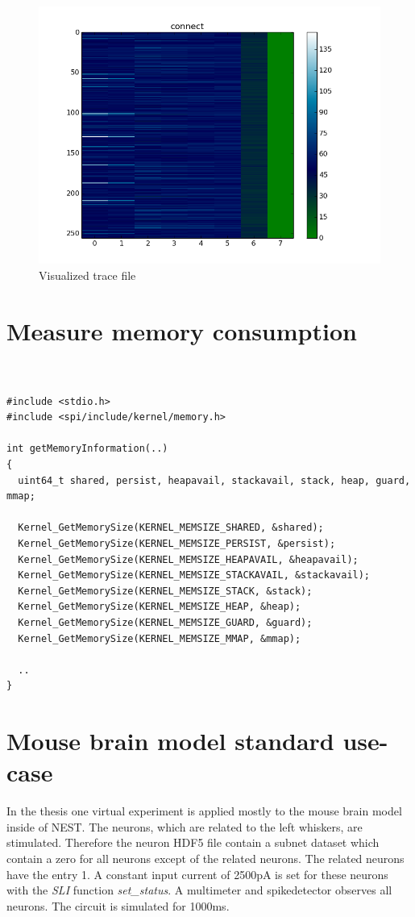 \begin{figure}[ht!]
\centering
\includegraphics[scale=0.4]{pictures/1per300_tracefile_connect.png}
\caption{Visualized trace file}
\end{figure}

\chapter{Measure memory consumption}
\label{bgqmemory}
\begin{lstlisting}


#include <stdio.h>
#include <spi/include/kernel/memory.h>

int getMemoryInformation(..)
{
  uint64_t shared, persist, heapavail, stackavail, stack, heap, guard, mmap;

  Kernel_GetMemorySize(KERNEL_MEMSIZE_SHARED, &shared);
  Kernel_GetMemorySize(KERNEL_MEMSIZE_PERSIST, &persist);
  Kernel_GetMemorySize(KERNEL_MEMSIZE_HEAPAVAIL, &heapavail);
  Kernel_GetMemorySize(KERNEL_MEMSIZE_STACKAVAIL, &stackavail);
  Kernel_GetMemorySize(KERNEL_MEMSIZE_STACK, &stack);
  Kernel_GetMemorySize(KERNEL_MEMSIZE_HEAP, &heap);
  Kernel_GetMemorySize(KERNEL_MEMSIZE_GUARD, &guard);
  Kernel_GetMemorySize(KERNEL_MEMSIZE_MMAP, &mmap);

  ..
}

\end{lstlisting}

\chapter{Mouse brain model standard use-case}
\label{ambmusecase}
In the thesis one virtual experiment is applied mostly to the mouse brain model inside of NEST.
The neurons, which are related to the left whiskers, are stimulated.
Therefore the neuron HDF5 file contain a subnet dataset which contain a zero
for all neurons except of the related neurons. The related neurons have the entry 1.
A constant input current of 2500pA is set for these neurons with the \emph{SLI} function \emph{set\_status}.
A multimeter and spikedetector observes all neurons.
The circuit is simulated for 1000ms.

